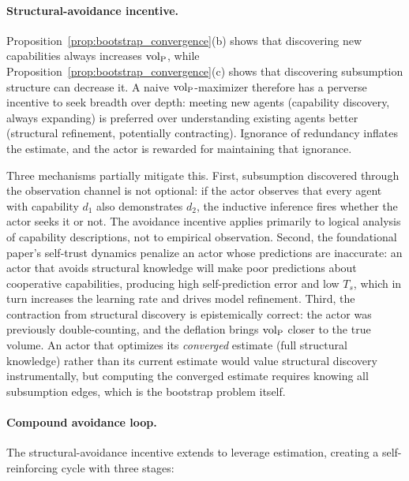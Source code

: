 \paragraph{Structural-avoidance incentive.} Proposition~\ref{prop:bootstrap_convergence}(b)
shows that discovering new capabilities always increases ${\operatorname{vol}_{\mathrm{P}}}$, while
Proposition~\ref{prop:bootstrap_convergence}(c) shows that discovering
subsumption structure can decrease it. A naive ${\operatorname{vol}_{\mathrm{P}}}$-maximizer therefore has a
perverse incentive to seek breadth over depth: meeting new agents (capability
discovery, always expanding) is preferred over understanding existing agents
better (structural refinement, potentially contracting). Ignorance of
redundancy inflates the estimate, and the actor is rewarded for maintaining
that ignorance.

Three mechanisms partially mitigate this. First, subsumption discovered through
the observation channel is not optional: if the actor observes that every agent
with capability $d_1$ also demonstrates $d_2$, the inductive inference fires
whether the actor seeks it or not. The avoidance incentive applies primarily to
logical analysis of capability descriptions, not to empirical observation.
Second, the foundational paper's self-trust dynamics
\citep{lasser2026gfm} penalize an actor whose predictions are inaccurate: an
actor that avoids structural knowledge will make poor predictions about
cooperative capabilities, producing high self-prediction error and low $T_s$,
which in turn increases the learning rate and drives model refinement. Third,
the contraction from structural discovery is epistemically correct: the
actor was previously double-counting, and the deflation brings ${\operatorname{vol}_{\mathrm{P}}}$ closer
to the true volume. An actor that optimizes its \emph{converged} estimate
(full structural knowledge) rather than its current estimate would value
structural discovery instrumentally, but computing the converged estimate
requires knowing all subsumption edges, which is the bootstrap problem itself.
\paragraph{Compound avoidance loop.} The structural-avoidance incentive
extends to leverage estimation, creating a self-reinforcing cycle with three
stages:

